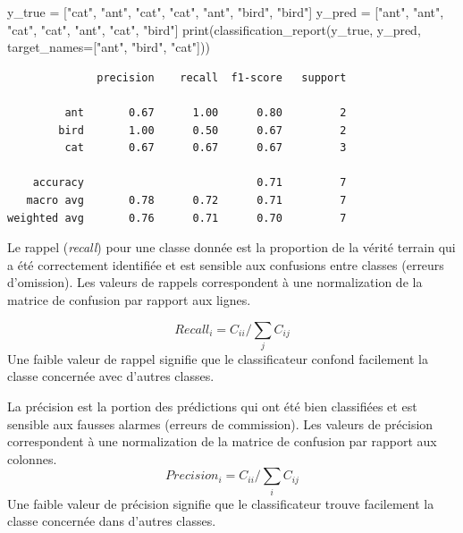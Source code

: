 \documentclass[
  11pt,
  letterpaper,
  open=any,
  twoside=false,
  french]{scrbook}
\newenvironment{Shaded}{\begin{snugshade}}{\end{snugshade}}
\newcommand{\BuiltInTok}[1]{\textcolor[rgb]{0.00,0.23,0.31}{#1}}
\newcommand{\NormalTok}[1]{\textcolor[rgb]{0.00,0.23,0.31}{#1}}
\newcommand{\OperatorTok}[1]{\textcolor[rgb]{0.37,0.37,0.37}{#1}}
\newcommand{\StringTok}[1]{\textcolor[rgb]{0.13,0.47,0.30}{#1}}
\begin{document}
\begin{Shaded}
\begin{Highlighting}[]
\NormalTok{y\_true }\OperatorTok{=}\NormalTok{ [}\StringTok{"cat"}\NormalTok{, }\StringTok{"ant"}\NormalTok{, }\StringTok{"cat"}\NormalTok{, }\StringTok{"cat"}\NormalTok{, }\StringTok{"ant"}\NormalTok{, }\StringTok{"bird"}\NormalTok{, }\StringTok{"bird"}\NormalTok{]}
\NormalTok{y\_pred }\OperatorTok{=}\NormalTok{ [}\StringTok{"ant"}\NormalTok{, }\StringTok{"ant"}\NormalTok{, }\StringTok{"cat"}\NormalTok{, }\StringTok{"cat"}\NormalTok{, }\StringTok{"ant"}\NormalTok{, }\StringTok{"cat"}\NormalTok{, }\StringTok{"bird"}\NormalTok{]}
\BuiltInTok{print}\NormalTok{(classification\_report(y\_true, y\_pred, target\_names}\OperatorTok{=}\NormalTok{[}\StringTok{"ant"}\NormalTok{, }\StringTok{"bird"}\NormalTok{, }\StringTok{"cat"}\NormalTok{]))}
\end{Highlighting}
\end{Shaded}

\begin{verbatim}
              precision    recall  f1-score   support

         ant       0.67      1.00      0.80         2
        bird       1.00      0.50      0.67         2
         cat       0.67      0.67      0.67         3

    accuracy                           0.71         7
   macro avg       0.78      0.72      0.71         7
weighted avg       0.76      0.71      0.70         7
\end{verbatim}

Le rappel (\emph{recall}) pour une classe donnée est la proportion de la
vérité terrain qui a été correctement identifiée et est sensible aux
confusions entre classes (erreurs d'omission). Les valeurs de rappels
correspondent à une normalization de la matrice de confusion par rapport
aux lignes.

\[
Recall_i= C_{ii} / \sum_j C_{ij}
\] Une faible valeur de rappel signifie que le classificateur confond
facilement la classe concernée avec d'autres classes.

La précision est la portion des prédictions qui ont été bien classifiées
et est sensible aux fausses alarmes (erreurs de commission). Les valeurs
de précision correspondent à une normalization de la matrice de
confusion par rapport aux colonnes. \[
Precision_i= C_{ii} / \sum_i C_{ij}
\] Une faible valeur de précision signifie que le classificateur trouve
facilement la classe concernée dans d'autres classes.
\end{document}
